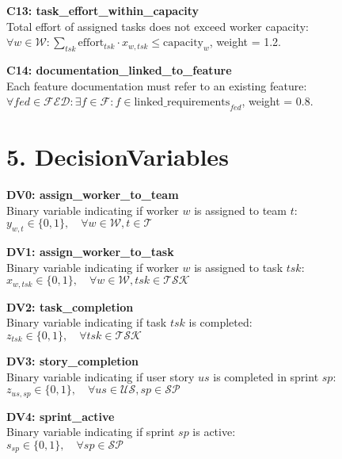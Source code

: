 \documentclass[12pt]{article}
\begin{document}
    \item \textbf{C13: task_effort_within_capacity} \\
    Total effort of assigned tasks does not exceed worker capacity: \\
    $\forall w \in \mathcal{W}: \sum_{tsk} \text{effort}_{tsk} \cdot x_{w,tsk} \leq \text{capacity}_w$, weight = 1.2.

    \item \textbf{C14: documentation_linked_to_feature} \\
    Each feature documentation must refer to an existing feature: \\
    $\forall fed \in \mathcal{FED}: \exists f \in \mathcal{F}: f \in \text{linked\_requirements}_{fed}$, weight = 0.8.

\section{5. DecisionVariables}

\item \textbf{DV0: assign\_worker\_to\_team} \\
    Binary variable indicating if worker $w$ is assigned to team $t$: \\
    $y_{w,t} \in \{0,1\}, \quad \forall w \in \mathcal{W}, t \in \mathcal{T}$

    \item \textbf{DV1: assign\_worker\_to\_task} \\
    Binary variable indicating if worker $w$ is assigned to task $tsk$: \\
    $x_{w,tsk} \in \{0,1\}, \quad \forall w \in \mathcal{W}, tsk \in \mathcal{TSK}$

    \item \textbf{DV2: task\_completion} \\
    Binary variable indicating if task $tsk$ is completed: \\
    $z_{tsk} \in \{0,1\}, \quad \forall tsk \in \mathcal{TSK}$

    \item \textbf{DV3: story\_completion} \\
    Binary variable indicating if user story $us$ is completed in sprint $sp$: \\
    $z_{us,sp} \in \{0,1\}, \quad \forall us \in \mathcal{US}, sp \in \mathcal{SP}$

    \item \textbf{DV4: sprint\_active} \\
    Binary variable indicating if sprint $sp$ is active: \\
    $s_{sp} \in \{0,1\}, \quad \forall sp \in \mathcal{SP}$
\end{document}
